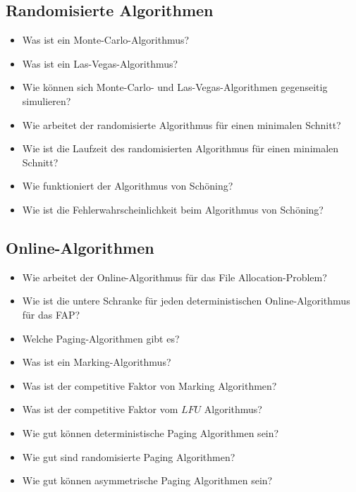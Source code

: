 \documentclass{panikzettel}
\begin{document}
\begin{halfboxl}

\subsection*{Randomisierte Algorithmen}
\begin{itemize}
    \item Was ist ein Monte-Carlo-Algorithmus?
    \item Was ist ein Las-Vegas-Algorithmus?
    \item Wie können sich Monte-Carlo- und Las-Vegas-Algorithmen gegenseitig simulieren?
    \item Wie arbeitet der randomisierte Algorithmus für einen minimalen Schnitt?
    \item Wie ist die Laufzeit des randomisierten Algorithmus für einen minimalen Schnitt?
    \item Wie funktioniert der Algorithmus von Schöning?
    \item Wie ist die Fehlerwahrscheinlichkeit beim Algorithmus von Schöning?
\end{itemize}

\end{halfboxl}%
\begin{halfboxr}

\subsection*{Online-Algorithmen}
\begin{itemize}
    \item Wie arbeitet der Online-Algorithmus für das File Allocation-Problem?
    \item Wie ist die untere Schranke für jeden deterministischen Online-Algorithmus für das FAP?
    \item Welche Paging-Algorithmen gibt es?
    \item Was ist ein Marking-Algorithmus?
    \item Was ist der competitive Faktor von Marking Algorithmen?
    \item Was ist der competitive Faktor vom $LFU$ Algorithmus?
    \item Wie gut können deterministische Paging Algorithmen sein?
    \item Wie gut sind randomisierte Paging Algorithmen?
    \item Wie gut können asymmetrische Paging Algorithmen sein?
\end{itemize}

\end{halfboxr}
\end{document}
